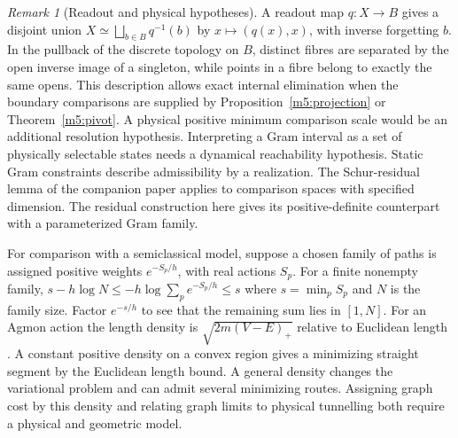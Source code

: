 \documentclass[11pt,reqno]{amsart}
\theoremstyle{definition}
\theoremstyle{remark}
\newtheorem{remark}[theorem]{Remark}
\numberwithin{equation}{section}
\begin{document}
\begin{remark}[Readout and physical hypotheses]\label{m5:hypotheses}
A readout map \(q:X\to B\) gives a disjoint union
\(X\simeq\bigsqcup_{b\in B}q^{-1}(b)\) by \(x\mapsto(q(x),x)\), with
inverse forgetting \(b\). In the pullback of the discrete topology
on \(B\), distinct fibres are separated by the open inverse image of
a singleton, while points in a fibre belong to exactly the same opens.
This description allows exact internal elimination when the
boundary comparisons are supplied by
Proposition~\ref{m5:projection} or Theorem~\ref{m5:pivot}.
A physical positive minimum comparison scale would be an additional
resolution hypothesis. Interpreting a Gram interval as a set of
physically selectable states needs a dynamical reachability hypothesis.
Static Gram constraints describe admissibility by a realization.
The Schur-residual lemma of the companion paper \cite[Lemma~359]{Companion} applies to comparison spaces with
specified dimension. The residual construction here gives its
positive-definite counterpart with a parameterized Gram family.

For comparison with a semiclassical model, suppose a chosen family
of paths is assigned positive weights \(e^{-S_p/h}\), with real actions
\(S_p\). For a finite nonempty family,
\(s-h\log N\leq-h\log\sum_p e^{-S_p/h}\leq s\)
where \(s=\min_p S_p\) and \(N\) is the family size. Factor
\(e^{-s/h}\) to see that the remaining sum lies in \([1,N]\).
For an Agmon action the length density is
\(\sqrt{2m(V-E)_+}\) relative to Euclidean length
\cite{m5:Agmon}. A constant positive density on a convex region
gives a minimizing straight segment by the Euclidean length bound.
A general density changes the variational problem and can admit
several minimizing routes. Assigning graph cost by this density
and relating graph limits to physical tunnelling both require
a physical and geometric model.
\end{remark}
\end{document}
